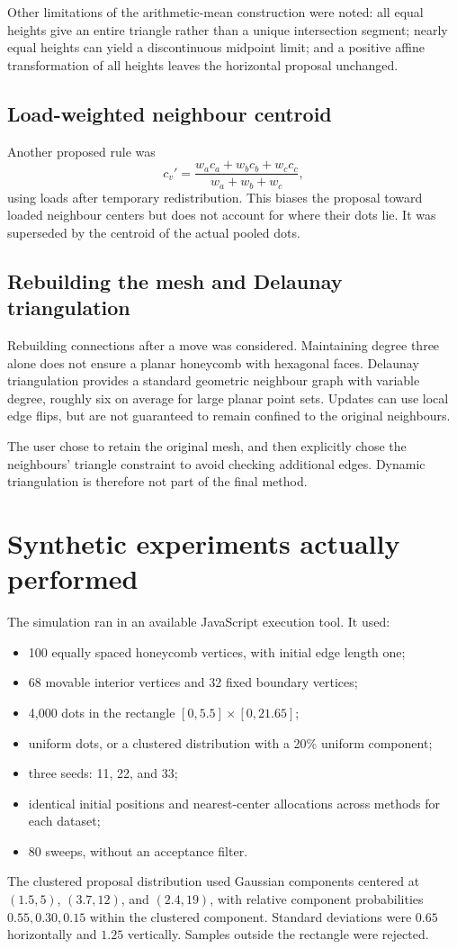 \documentclass[11pt]{article}
\begin{document}
Other limitations of the arithmetic-mean construction were noted: all equal heights give an entire triangle rather than a unique intersection segment; nearly equal heights can yield a discontinuous midpoint limit; and a positive affine transformation of all heights leaves the horizontal proposal unchanged.

\subsection{Load-weighted neighbour centroid}
Another proposed rule was
\[
c_v'=\frac{w_a c_a+w_b c_b+w_c c_c}{w_a+w_b+w_c},
\]
using loads after temporary redistribution. This biases the proposal toward loaded neighbour centers but does not account for where their dots lie. It was superseded by the centroid of the actual pooled dots.

\subsection{Rebuilding the mesh and Delaunay triangulation}
Rebuilding connections after a move was considered. Maintaining degree three alone does not ensure a planar honeycomb with hexagonal faces. Delaunay triangulation provides a standard geometric neighbour graph with variable degree, roughly six on average for large planar point sets. Updates can use local edge flips, but are not guaranteed to remain confined to the original neighbours.

The user chose to retain the original mesh, and then explicitly chose the neighbours' triangle constraint to avoid checking additional edges. Dynamic triangulation is therefore not part of the final method.

\section{Synthetic experiments actually performed}
The simulation ran in an available JavaScript execution tool. It used:
\begin{itemize}
\item 100 equally spaced honeycomb vertices, with initial edge length one;
\item 68 movable interior vertices and 32 fixed boundary vertices;
\item 4,000 dots in the rectangle $[0,5.5]\times[0,21.65]$;
\item uniform dots, or a clustered distribution with a 20\% uniform component;
\item three seeds: 11, 22, and 33;
\item identical initial positions and nearest-center allocations across methods for each dataset;
\item 80 sweeps, without an acceptance filter.
\end{itemize}
The clustered proposal distribution used Gaussian components centered at $(1.5,5)$, $(3.7,12)$, and $(2.4,19)$, with relative component probabilities $0.55,0.30,0.15$ within the clustered component. Standard deviations were $0.65$ horizontally and $1.25$ vertically. Samples outside the rectangle were rejected.
\end{document}
